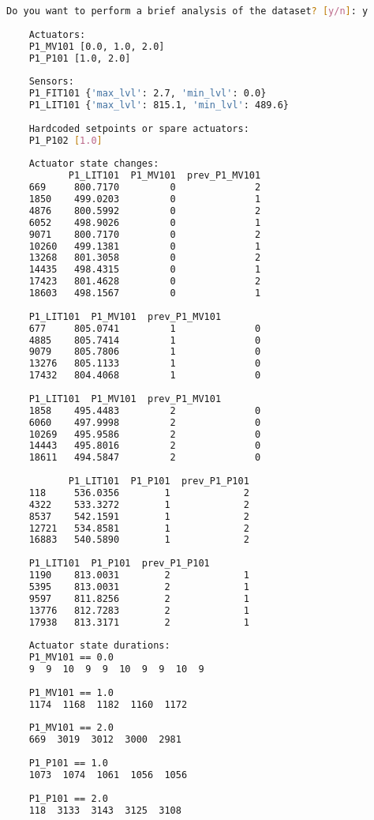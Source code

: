 \begin{lstlisting}[language=bash,numbers=none,caption={Example of preliminar system analysis},label=lst:4_brief_infos]
	Do you want to perform a brief analysis of the dataset? [y/n]: y
	
	Actuators: 
	P1_MV101 [0.0, 1.0, 2.0]
	P1_P101 [1.0, 2.0]
	
	Sensors: 
	P1_FIT101 {'max_lvl': 2.7, 'min_lvl': 0.0}
	P1_LIT101 {'max_lvl': 815.1, 'min_lvl': 489.6}
	
	Hardcoded setpoints or spare actuators: 
	P1_P102 [1.0]
	
	Actuator state changes:
	       P1_LIT101  P1_MV101  prev_P1_MV101
	669     800.7170         0              2
	1850    499.0203         0              1
	4876    800.5992         0              2
	6052    498.9026         0              1
	9071    800.7170         0              2
	10260   499.1381         0              1
	13268   801.3058         0              2
	14435   498.4315         0              1
	17423   801.4628         0              2
	18603   498.1567         0              1
	
	P1_LIT101  P1_MV101  prev_P1_MV101
	677     805.0741         1              0
	4885    805.7414         1              0
	9079    805.7806         1              0
	13276   805.1133         1              0
	17432   804.4068         1              0
	
	P1_LIT101  P1_MV101  prev_P1_MV101
	1858    495.4483         2              0
	6060    497.9998         2              0
	10269   495.9586         2              0
	14443   495.8016         2              0
	18611   494.5847         2              0
	
	       P1_LIT101  P1_P101  prev_P1_P101
	118     536.0356        1             2
	4322    533.3272        1             2
	8537    542.1591        1             2
	12721   534.8581        1             2
	16883   540.5890        1             2
	
	P1_LIT101  P1_P101  prev_P1_P101
	1190    813.0031        2             1
	5395    813.0031        2             1
	9597    811.8256        2             1
	13776   812.7283        2             1
	17938   813.3171        2             1
	
	Actuator state durations:
	P1_MV101 == 0.0
	9  9  10  9  9  10  9  9  10  9
	
	P1_MV101 == 1.0
	1174  1168  1182  1160  1172
	
	P1_MV101 == 2.0
	669  3019  3012  3000  2981
	
	P1_P101 == 1.0
	1073  1074  1061  1056  1056
	
	P1_P101 == 2.0
	118  3133  3143  3125  3108
\end{lstlisting}

